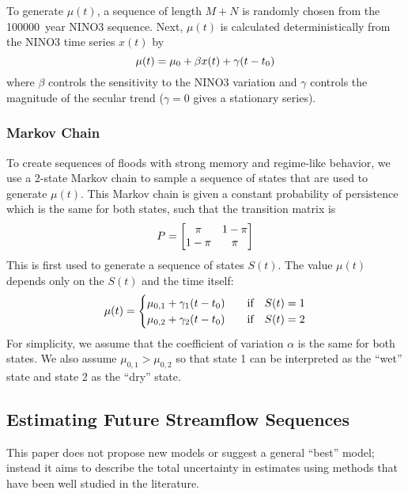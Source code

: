 \documentclass[12pt]{article}
\begin{document}
To generate $\mu(t)$, a sequence of length $M+N$ is randomly chosen from the \SI{100000}{year} NINO3 sequence.
Next, $\mu(t)$ is calculated deterministically from the NINO3 time series $x(t)$ by
\begin{equation}
  \mu(t) = \mu_0 + \beta x(t) + \gamma \qty(t - t_0)
\end{equation}
where $\beta$ controls the sensitivity to the NINO3 variation and $\gamma$ controls the magnitude of the secular trend ($\gamma=0$ gives a stationary series).

\subsubsection{Markov Chain\label{sec:methods-markov}}

To create sequences of floods with strong memory and regime-like behavior, we use a 2-state Markov chain to sample a sequence of states that are used to generate $\mu(t)$.
This Markov chain is given a constant probability of persistence which is the same for both states, such that the transition matrix is
\begin{equation*}
  P = \mqty[\pi & 1-\pi \\ 1-\pi & \pi]
\end{equation*}
This is first used to generate a sequence of states $S(t)$.
The value $\mu(t)$ depends only on the $S(t)$ and the time itself:
\begin{equation*}
  \mu(t) = \begin{cases}
    \mu_{0,1} + \gamma_1 \qty(t - t_0) & \qqtext{if} S(t) = 1 \\
    \mu_{0,2} + \gamma_2 \qty(t - t_0) & \qqtext{if} S(t) = 2
  \end{cases}
\end{equation*}
For simplicity, we assume that the coefficient of variation $\alpha$ is the same for both states.
We also assume $\mu_{0, 1} > \mu_{0, 2}$ so that state 1 can be interpreted as the ``wet'' state and state 2 as the ``dry'' state.

\subsection{Estimating Future Streamflow Sequences\label{sec:estimation}}

This paper does not propose new models or suggest a general ``best'' model; instead it aims to describe the total uncertainty in estimates using methods that have been well studied in the literature.
\end{document}
